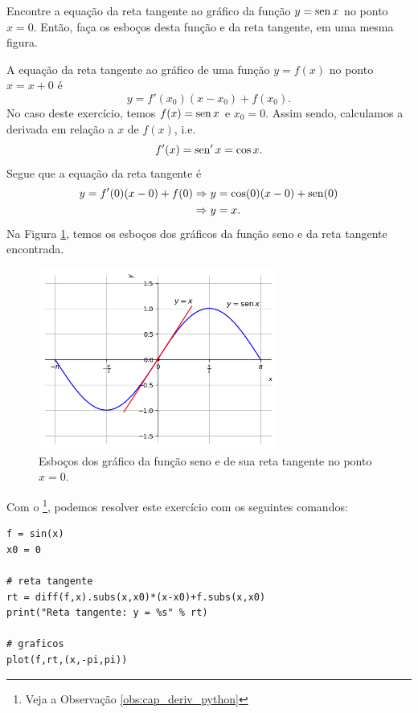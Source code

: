 \begin{exeresol}
  Encontre a equação da reta tangente ao gráfico da função $y = \operatorname{sen} x$ no ponto $x=0$. Então, faça os esboços desta função e da reta tangente, em uma mesma figura.
\end{exeresol}
\begin{resol}
  A equação da reta tangente ao gráfico de uma função $y = f(x)$ no ponto $x=x+0$ é
  \begin{equation}
    y = f'(x_0)(x-x_0)+f(x_0).
  \end{equation}
  No caso deste exercício, temos $f(x)=\operatorname{sen} x$ e $x_0=0$. Assim sendo, calculamos a derivada em relação a $x$ de $f(x)$, i.e.
  \begin{equation}
    f'(x) = \operatorname{sen}' x = \cos x.
  \end{equation}
  Segue que a equação da reta tangente é
  \begin{align}
    y = f'(0)(x-0)+f(0) &\Rightarrow y = \cos(0)(x-0)+\operatorname{sen}(0) \\
                        &\Rightarrow y = x.
  \end{align}
  Na Figura \ref{fig:deriv_exeresol_rt_sen0}, temos os esboços dos gráficos da função seno e da reta tangente encontrada.

  \begin{figure}[H]
    \centering
    \includegraphics[width=0.7\textwidth]{./cap_deriv/dados/fig_deriv_exeresol_rt_sen0/fig_deriv_exeresol_rt_sen0}
    \caption{Esboços dos gráfico da função seno e de sua reta tangente no ponto $x=0$.}
    \label{fig:deriv_exeresol_rt_sen0}
  \end{figure}

  \ifispython
  Com o \sympy\footnote{Veja a Observação \ref{obs:cap_deriv_python}}, podemos resolver este exercício com os seguintes comandos:
\begin{verbatim}
f = sin(x)
x0 = 0

# reta tangente
rt = diff(f,x).subs(x,x0)*(x-x0)+f.subs(x,x0)
print("Reta tangente: y = %s" % rt)

# graficos
plot(f,rt,(x,-pi,pi))
\end{verbatim}
  \fi  
\end{resol}

